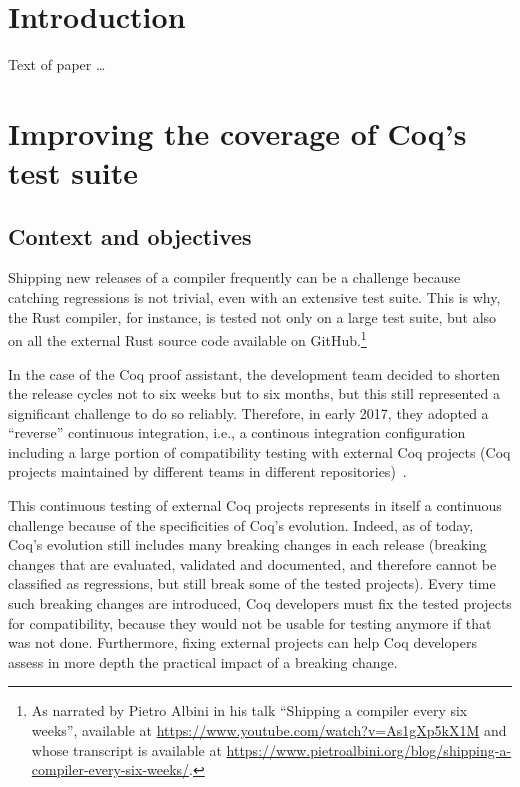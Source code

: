 \documentclass[sigplan,10pt,review,anonymous]{acmart}
\begin{document}
\section{Introduction}

Text of paper \ldots

\section{Improving the coverage of Coq's test suite}

\subsection{Context and objectives}

Shipping new releases of a compiler frequently can be a challenge
because catching regressions is not trivial, even with an extensive
test suite.
%
This is why, the Rust compiler, for instance, is tested not only on a
large test suite, but also on all the external Rust source code
available on GitHub.\footnote{As narrated by Pietro Albini in his talk
``Shipping a compiler every six weeks'', available at
\url{https://www.youtube.com/watch?v=As1gXp5kX1M} and whose transcript
is available at
\url{https://www.pietroalbini.org/blog/shipping-a-compiler-every-six-weeks/}.}

In the case of the Coq proof assistant, the development team decided
to shorten the release cycles not to six weeks but to six months, but
this still represented a significant challenge to do so reliably.
%
Therefore, in early 2017, they adopted a ``reverse'' continuous
integration, i.e., a continous integration configuration including a
large portion of compatibility testing with external Coq projects (Coq
projects maintained by different teams in different
repositories)~\cite{zimmermann:tel-02451322}.

This continuous testing of external Coq projects represents in itself
a continuous challenge because of the specificities of Coq's
evolution.
%
Indeed, as of today, Coq's evolution still includes many breaking
changes in each release (breaking changes that are evaluated,
validated and documented, and therefore cannot be classified as
regressions, but still break some of the tested projects).
%
Every time such breaking changes are introduced, Coq developers must
fix the tested projects for compatibility, because they would not be
usable for testing anymore if that was not done.
%
Furthermore, fixing external projects can help Coq developers assess
in more depth the practical impact of a breaking change.
\end{document}
